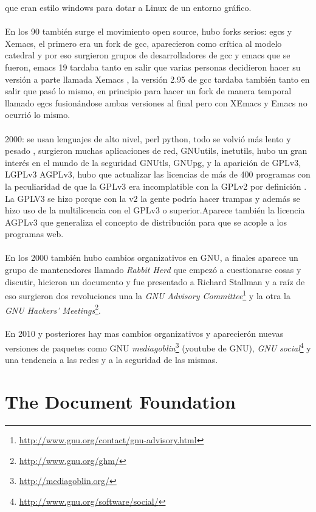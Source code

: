 \documentclass[a4paper,oneside,11pt]{article}
\begin{document}
       que eran estilo windows para dotar a Linux de un entorno gr\'afico.
 \\\\
En los 90 tambi\'en surge el movimiento open source, 
hubo forks serios: egcs y Xemacs, el primero era un fork de gcc, aparecieron como cr\'itica al modelo
 catedral y por eso surgieron grupos de desarrolladores de gcc y emacs que se fueron, emacs 19
  tardaba tanto en salir que varias personas decidieron hacer su versi\'on a parte llamada Xemacs , la versi\'on 2.95 de gcc 
  tardaba tambi\'en tanto en salir que pas\'o lo mismo, en principio para hacer un fork de manera temporal llamado egcs fusion\'andose
  ambas versiones al final pero con XEmacs y Emacs no ocurri\'o lo mismo.
\\\\
2000: se usan lenguajes de alto nivel, perl python, todo se volvi\'o m\'as lento y pesado , surgieron
 muchas aplicaciones de red, GNUutils, inetutils, hubo un gran inter\'es en el mundo de la seguridad
  GNUtls, GNUpg, y la aparici\'on de GPLv3, LGPLv3 AGPLv3,  hubo que actualizar las licencias de m\'as
   de 400 programas con la peculiaridad de que la GPLv3 era incomplatible con la GPLv2 por definici\'on .
    La GPLV3 se hizo porque con la v2 la gente podr\'ia hacer trampas  y adem\'as se hizo uso de la
     multilicencia con el GPLv3  o superior.Aparece tambi\'en la licencia AGPLv3 que generaliza el concepto de distribuci\'on
      para que se acople a los programas web.
\\\\
En los 2000 tambi\'en hubo cambios organizativos en GNU, a finales aparece un grupo de mantenedores
 llamado \emph{Rabbit Herd} que empez\'o a cuestionarse cosas y discutir, hicieron un documento y fue
  presentado a Richard Stallman y a ra\'iz de eso surgieron dos revoluciones una la \emph{GNU Advisory Committee}\footnote{\url{http://www.gnu.org/contact/gnu-advisory.html}} y la otra la \emph{GNU Hackers' Meetings}\footnote{\url{http://www.gnu.org/ghm/}}.
\\\\
En  2010 y posteriores hay mas cambios organizativos y aparecier\'on nuevas versiones de paquetes como GNU \emph{mediagoblin}\footnote{\url{http://mediagoblin.org/}} (youtube de GNU),
 \emph{GNU social}\footnote{\url{http://www.gnu.org/software/social/}} y una tendencia a las redes y a la seguridad de las mismas.

\section{The Document Foundation}
\end{document}
